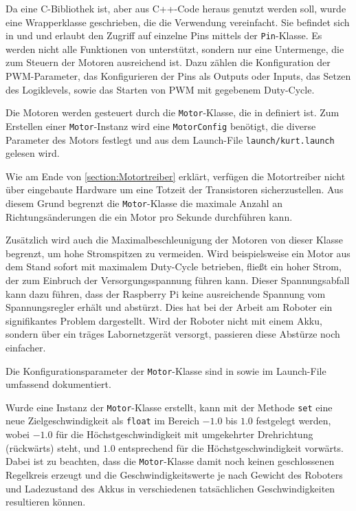 \documentclass[german]{thesis_KBS}
\newcommand{\code}[1]{\texttt{#1}}  %
\begin{document}
Da \pigpio{} eine C-Bibliothek ist, aber aus C++-Code heraus genutzt werden
soll, wurde eine Wrapperklasse geschrieben, die die Verwendung vereinfacht. Sie
befindet sich in  und  und erlaubt den
Zugriff auf einzelne Pins mittels der \code{Pin}-Klasse. Es werden nicht alle
Funktionen von \pigpio{} unterstützt, sondern nur eine Untermenge, die zum
Steuern der Motoren ausreichend ist. Dazu zählen die Konfiguration der
PWM-Parameter, das Konfigurieren der Pins als Outputs oder Inputs, das Setzen
des Logiklevels, sowie das Starten von PWM mit gegebenem Duty-Cycle.

Die Motoren werden gesteuert durch die \code{Motor}-Klasse, die in
 definiert ist. Zum Erstellen einer \code{Motor}-Instanz
wird eine \code{MotorConfig} benötigt, die diverse Parameter des Motors festlegt
und aus dem Launch-File \code{launch/kurt.launch} gelesen wird.

Wie am Ende von \autoref{section:Motortreiber} erklärt, verfügen die
Motortreiber nicht über eingebaute Hardware um eine Totzeit der Transistoren
sicherzustellen. Aus diesem Grund begrenzt die \code{Motor}-Klasse die maximale
Anzahl an Richtungsänderungen die ein Motor pro Sekunde durchführen kann.

Zusätzlich wird auch die Maximalbeschleunigung der Motoren von dieser Klasse
begrenzt, um hohe Stromspitzen zu vermeiden. Wird beispielsweise ein Motor aus
dem Stand sofort mit maximalem Duty-Cycle betrieben, fließt ein hoher Strom, der
zum Einbruch der Versorgungsspannung führen kann. Dieser Spannungsabfall kann
dazu führen, dass der Raspberry Pi keine ausreichende Spannung vom
Spannungsregler erhält und abstürzt. Dies hat bei der Arbeit am Roboter ein
signifikantes Problem dargestellt. Wird der Roboter nicht mit einem Akku,
sondern über ein träges Labornetzgerät versorgt, passieren diese Abstürze noch
einfacher.

Die Konfigurationsparameter der \code{Motor}-Klasse sind in 
sowie im Launch-File  umfassend dokumentiert.

Wurde eine Instanz der \code{Motor}-Klasse erstellt, kann mit der Methode
\code{set} eine neue Zielgeschwindigkeit als \code{float} im Bereich $-1.0$ bis
$1.0$ festgelegt werden, wobei $-1.0$ für die Höchstgeschwindigkeit mit
umgekehrter Drehrichtung (rückwärts) steht, und $1.0$ entsprechend für die
Höchstgeschwindigkeit vorwärts. Dabei ist zu beachten, dass die
\code{Motor}-Klasse damit noch keinen geschlossenen Regelkreis erzeugt und die
Geschwindigkeitswerte je nach Gewicht des Roboters und Ladezustand des Akkus
in verschiedenen tatsächlichen Geschwindigkeiten resultieren können.
\end{document}
